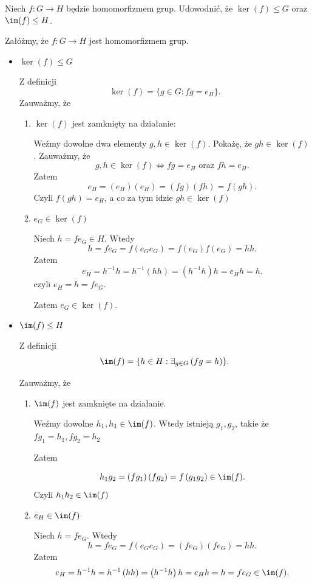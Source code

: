 \begin{problem}[3]

	Niech $f: G \rightarrow H$ będzie homomorfizmem grup. Udowodnić, że $\ker(f) \le G$ oraz $\im(f) \le H$.
\end{problem}
\begin{solution}

	Załóżmy, że $f:G\rightarrow H$ jest homomorfizmem grup.
	\begin{itemize}
		\item $\ker(f) \le  G$ 
			
			Z definicji 
			\[
			\ker(f) = \{g \in G: fg = e_{H}\} 
			.\] 
			Zauważmy, że
			\begin{enumerate}
				\item $\ker(f) $ jest zamknięty na działanie:

					Weźmy dowolne dwa elementy $g,h \in \ker(f)$. Pokażę, że $gh\in \ker(f)$. Zauważmy, że
					\[
						g,h \in \ker(f) \iff fg = e_H \text{ oraz } fh = e_H 
					.\] 					Zatem
					\[
					e_H = \left( e_H \right) \left( e_H \right) = \left( fg \right) \left( fh \right) = f\left( gh \right)  					.\] 
					Czyli $f\left( gh \right) = e_H$, a co za tym idzie $gh \in \ker(f) $
		\item $e_{G} \in \ker(f) $

			Niech $h = fe_G \in H$.
			Wtedy
			 \[
			h = fe_G = f\left( e_Ge_G \right) = f\left( e_G \right) f\left( e_G \right) = hh  
			.\]
			Zatem
			\[
			e_H = h^{-1}h = h^{-1}\left( hh \right) = \left( h^{-1}h \right) h = e_Hh = h
			.\]  czyli $e_H = h = fe_G$.

			Zatem  $e_G\in \ker(f) $.
			\end{enumerate}
		\item $\im(f) \le H$

			Z definicji
			\[
			\im(f)  = \{h \in H: \exists_{g\in G} \left( fg = h \right)  \} 
			.\] 

			Zauważmy, że
			\begin{enumerate}
				\item $\im(f)$ jest zamknięte na działanie.

					Weźmy dowolne $h_1,h_1 \in \im(f) $.
					Wtedy istnieją $g_1,g_2$, takie że $fg_1 = h_1, fg_2 = h_2$
					
					Zatem

					\[
					h_1g_2 = \left( fg_1 \right) \left( fg_2 \right) = f\left( g_1g_2 \right) \in \im(f) 
					.\] 
					Czyli $h_1h_2 \in \im(f) $
				\item $e_H \in \im(f)$ 
					
					Niech $h = fe_G$. Wtedy
					 \[
					h = fe_G = f\left( e_Ge_G \right) = \left( fe_G \right) \left( fe_G \right) = hh
					.\] 
					Zatem 
					\[
					e_H = h^{-1}h = h^{-1}\left( hh \right) = \left( h^{-1}h \right) h = e_Hh = h = fe_G \in \im(f)  
					.\] 
			\end{enumerate}
	\end{itemize}
\end{solution}
